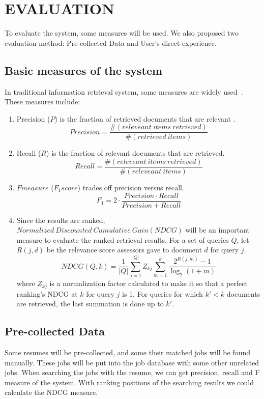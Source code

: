 \chapter{EVALUATION}

To evaluate the system, some measures will be used. We also proposed two evaluation method: Pre-collected Data and User's direct experience.

\section{Basic measures of the system}

In traditional information retrieval system, some measures are widely used~\cite{manning2008introduction}. These measures include:

\begin{enumerate}
    \item Precision ($P$) is the fraction of retrieved documents that are relevant .
       $$  Precision =  \frac{ \#(releveant~items~ retrieved)}{ \#(retrieved~items)}$$
    \item Recall ($R$) is the fraction of relevant documents that are retrieved.
       $$  Recall =  \frac{ \#(releveant~items~ retrieved)}{ \#(releveant~items)}$$
    \item $F measure$ ($F_1 score$) trades off precision versus recall.
       $$ F_1 = 2 \cdot \frac{ Precision \cdot Recall}{ Precision + Recall } $$
    \item Since the results are ranked, $ Normalized~Discounted~Cumulative~Gain ( NDCG )$ will be an important measure to evaluate the ranked retrieval results. For a set of queries $Q$, let $R(j,d)$ be the relevance score assessors gave to document $d$ for query $j$.
       $$ NDCG(Q,k) = \frac {1}{|Q|} \sum_{j=1}^{|Q|}{Z_{kj}} \sum_{m=1}^{k} \frac{2^{R(j,m)} - 1}{ \log_2(1+m)} $$
where $Z_{kj}$ is a normalization factor calculated to make it so that a perfect ranking's NDCG at $k$ for query $j$ is 1. For queries for which $k' < k$ documents are retrieved, the last summation is done up to $k'$.

\end{enumerate}

\section{Pre-collected Data}

Some resumes will be pre-collected, and some their matched jobs will be found manually. These jobs will be put into the job database with some other unrelated jobs.  When searching the jobs with the resume, we can get precision, recall and F measure of the system. With ranking positions of the searching results we could calculate the NDCG measure.

